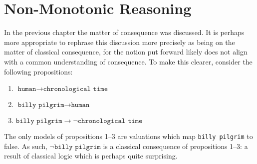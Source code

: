 \chapter{Non-Monotonic Reasoning}
\label{chapter:non-monotonic-reasoning}

In the previous chapter the matter of consequence was discussed. It is perhaps more appropriate to rephrase this discussion more precisely as being on the matter of classical consequence, for the notion put forward likely does not align with a common understanding of consequence. To make this clearer, consider the following propositions:
\begin{enumerate}
     \item $\texttt{human} \rightarrow \texttt{chronological time}$
     \item $\texttt{billy pilgrim} \rightarrow \texttt{human}$
     \item $\texttt{billy pilgrim} \rightarrow \neg \texttt{chronological time}$
\end{enumerate}
The only models of propositions 1--3 are valuations which map \texttt{billy pilgrim} to false. As such, $\neg \texttt{billy pilgrim}$ is a classical consequence of propositions 1--3: a result of classical logic which is perhaps quite surprising. 

